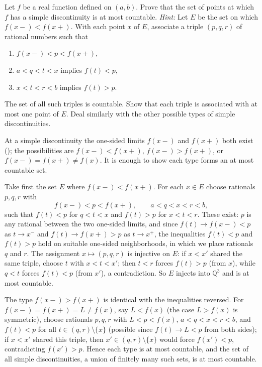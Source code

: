 \documentclass[main.tex]{subfiles}
\begin{document}
Let $f$ be a real function defined on $(a, b)$. Prove that the set of points at which $f$ has a simple discontinuity is at most countable. \textit{Hint:} Let $E$ be the set on which $f(x-) < f(x+)$. With each point $x$ of $E$, associate a triple $(p, q, r)$ of rational numbers such that
\begin{enumerate}
  \item $f(x-) < p < f(x+)$,
  \item $a < q < t < x$ implies $f(t) < p$,
  \item $x < t < r < b$ implies $f(t) > p$.
\end{enumerate}
The set of all such triples is countable. Show that each triple is associated with at most one point of $E$. Deal similarly with the other possible types of simple discontinuities.
\begin{SolutionBlue}
At a simple discontinuity the one-sided limits $f(x-)$ and $f(x+)$ both exist (); the possibilities are $f(x-) < f(x+)$, $f(x-) > f(x+)$, or $f(x-) = f(x+) \ne f(x)$. It is enough to show each type forms an at most countable set.

Take first the set $E$ where $f(x-) < f(x+)$. For each $x \in E$ choose rationals $p, q, r$ with
\[
f(x-) < p < f(x+), \qquad a < q < x < r < b,
\]
such that $f(t) < p$ for $q < t < x$ and $f(t) > p$ for $x < t < r$. These exist: $p$ is any rational between the two one-sided limits, and since $f(t) \to f(x-) < p$ as $t \to x^{-}$ and $f(t) \to f(x+) > p$ as $t \to x^{+}$, the inequalities $f(t) < p$ and $f(t) > p$ hold on suitable one-sided neighborhoods, in which we place rationals $q$ and $r$. The assignment $x \mapsto (p, q, r)$ is injective on $E$: if $x < x'$ shared the same triple, choose $t$ with $x < t < x'$; then $t < r$ forces $f(t) > p$ (from $x$), while $q < t$ forces $f(t) < p$ (from $x'$), a contradiction. So $E$ injects into $\mathbb{Q}^{3}$ and is at most countable.

The type $f(x-) > f(x+)$ is identical with the inequalities reversed. For $f(x-) = f(x+) = L \ne f(x)$, say $L < f(x)$ (the case $L > f(x)$ is symmetric), choose rationals $p, q, r$ with $L < p < f(x)$, $a < q < x < r < b$, and $f(t) < p$ for all $t \in (q, r) \setminus \{x\}$ (possible since $f(t) \to L < p$ from both sides); if $x < x'$ shared this triple, then $x' \in (q, r) \setminus \{x\}$ would force $f(x') < p$, contradicting $f(x') > p$. Hence each type is at most countable, and the set of all simple discontinuities, a union of finitely many such sets, is at most countable.
\end{SolutionBlue}
\end{document}
